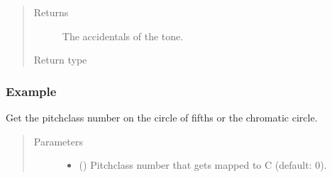 \documentclass[letterpaper,10pt,english]{sphinxmanual}
\begin{document}
\begin{fulllineitems}
\begin{fulllineitems}
\begin{quote}
\begin{description}
\item[{Returns}] \leavevmode
The accidentals of the tone.

\item[{Return type}] \leavevmode
{}

\end{description}\end{quote}
\subsubsection*{Example}

\begin{sphinxVerbatim}[commandchars=\\\{\}]
  
  
 
\end{sphinxVerbatim}

\end{fulllineitems}


\begin{fulllineitems}
\label{\detokenize{api:musictheory.Tone.get_pitch_class}}
Get the pitch\sphinxhyphen{}class number on the circle of fifths or the chromatic circle.
\begin{quote}\begin{description}
\item[{Parameters}] \leavevmode\begin{itemize}
\item {} 
 () \textendash{} Pitch\sphinxhyphen{}class number that gets mapped to C (default: 0).


\end{itemize}
\end{description}
\end{quote}
\end{fulllineitems}
\end{fulllineitems}
\end{document}
